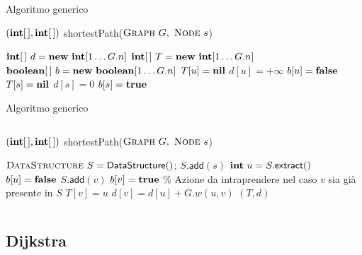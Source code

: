 \begin{frame}{Algoritmo generico}

\vspace{-9pt}
\begin{Procedure}
\caption[A]{$(\INTARRAY, \INTARRAY)$ \textsf{shortestPath}($\textsc{Graph}\ G,\ \textsc{Node}\ s$)}

$\INTEGER[\,]\ d = \NEW\ \INTEGER[1 \mldots G.n]$
$\INTEGER[\,]\ T = \NEW\ \INTEGER[1 \mldots G.n]$
$\BOOLEAN[\,]\ b = \NEW\ \BOOLEAN[1 \mldots G.n]$
{
  $T[u] = \textbf{nil}$\;
  $d[u] = +\infty$\; 
  $b[u] = \FALSE$\;
}
$T[s] = \textbf{nil}$\; 
$d[s] = 0$\; 
$b[s] = \TRUE$\;
[...]
\end{Procedure}

\end{frame}


\begin{frame}{Algoritmo generico}

\vspace{-24pt}
\begin{columns}
\small
\begin{Procedure}
\caption[A]{$(\INTARRAY, \INTARRAY)$ \textsf{shortestPath}($\textsc{Graph}\ G,\ \textsc{Node}\ s$)}
\alert{$\textsc{DataStructure}\ S = \textsf{DataStructure}()$; $S.\textsf{add}(s)$}\;
{
  \alert{$\INTEGER\ u = S.\textsf{extract}()$}\;
  $b[u] = \FALSE$\;
  {
    {
      {
        \alert{$S.\textsf{add}(v)$}\;
                $b[v] = \TRUE$\;
      }
      {
        \alert{\% Azione da intraprendere nel caso $v$ sia già presente in $S$}
      }
      $T[v] = u$\;
      $d[v] = d[u] + G.w(u,v)$\;
    }
  }
}
\Return $(T,d)$
\end{Procedure}
\end{columns}

\end{frame}

\subsection{Dijkstra}


